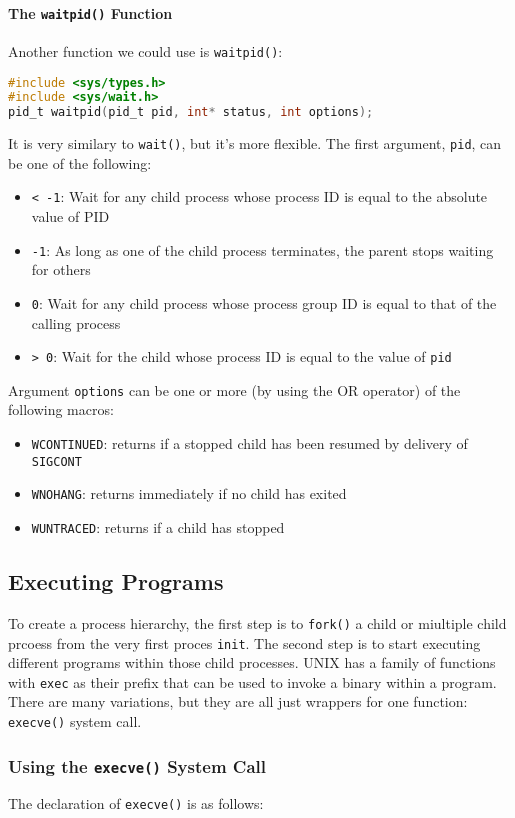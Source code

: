 \documentclass{article}
\renewcommand{\b}{\item[$\circ$]}
\newcommand{\newlist}{\begin{itemize}}
\renewcommand{\endlist}{\end{itemize}}
\newcommand{\code}[1]{\texttt{#1}}
\begin{document}
\paragraph{The \code{waitpid()} Function}

Another function we could use is \code{waitpid()}:

\begin{lstlisting}[language=c]
#include <sys/types.h>
#include <sys/wait.h>
pid_t waitpid(pid_t pid, int* status, int options);
\end{lstlisting}

It is very similary to \code{wait()}, but it's more flexible. The first argument, \code{pid}, can be one of the following:

\newlist
\b \code{< -1}: Wait for any child process whose process ID is equal to the absolute value of PID
\b \code{-1}: As long as one of the child process terminates, the parent stops waiting for others
\b \code{0}: Wait for any child process whose process group ID is equal to that of the calling process
\b \code{> 0}: Wait for the child whose process ID is equal to the value of \code{pid}
\endlist

Argument \code{options} can be one or more (by using the OR operator) of the following macros:

\newlist
\b \code{WCONTINUED}: returns if a stopped child has been resumed by delivery of \code{SIGCONT}
\b \code{WNOHANG}: returns immediately if no child has exited
\b \code{WUNTRACED}: returns if a child has stopped
\endlist

\subsection{Executing Programs}

To create a process hierarchy, the first step is to \code{fork()} a child or miultiple child prcoess from the very first proces \code{init}. The second step is to start executing different programs within those child processes. UNIX has a family of functions with \code{exec} as their prefix that can be used to invoke a binary within a program. There are many variations, but they are all just wrappers for one function: \code{execve()} system call. 

\subsubsection{Using the \code{execve()} System Call}

The declaration of \code{execve()} is as follows:
\end{document}
